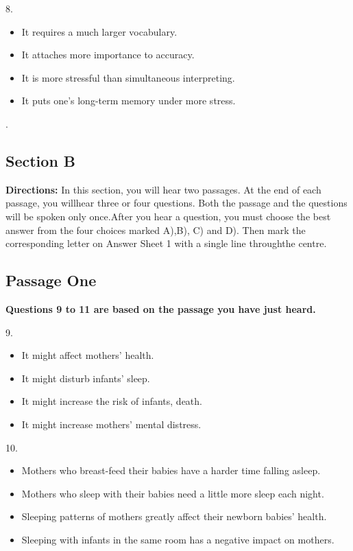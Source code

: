 \documentclass[UTF8,11pt]{ctexart}
\begin{document}
8.


\begin{itemize}[leftmargin=2em,itemsep=.2em,topsep=.4em]\item[A.] It requires a much larger vocabulary.
\item[B.] It attaches more importance to accuracy.
\item[C.] It is more stressful than simultaneous interpreting.
\item[D.] It puts one's long-term memory under more stress.
\end{itemize}

.


\subsection*{\textbf{Section B}}


\textbf{Directions:} In this section, you will hear two passages. At the end of each passage, you willhear three or four questions. Both the passage and the questions will be spoken only once.After you hear a question, you must choose the best answer from the four choices marked A),B), C) and D). Then mark the corresponding letter on Answer Sheet 1 with a single line throughthe centre.


\subsection*{\textbf{Passage One}}


\textbf{Questions 9 to 11 are based on the passage you have just heard.}


9.


\begin{itemize}[leftmargin=2em,itemsep=.2em,topsep=.4em]\item[A.] It might affect mothers' health.
\item[B.] It might disturb infants' sleep.
\item[C.] It might increase the risk of infants, death.
\item[D.] It might increase mothers' mental distress.
\end{itemize}

10.


\begin{itemize}[leftmargin=2em,itemsep=.2em,topsep=.4em]\item[A.] Mothers who breast-feed their babies have a harder time falling asleep.
\item[B.] Mothers who sleep with their babies need a little more sleep each night.
\item[C.] Sleeping patterns of mothers greatly affect their newborn babies' health.
\item[D.] Sleeping with infants in the same room has a negative impact on mothers.
\end{itemize}
\end{document}
